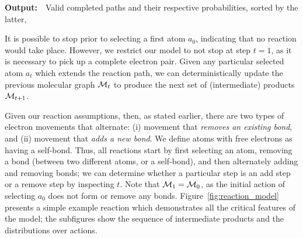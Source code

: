 \begin{algorithm}[t]
\begin{algorithmic}[1]

		
		
	
  \end{algorithmic}
  {\bf Output:}~~Valid completed paths and their respective probabilities, sorted by the latter, 
  \label{algo:valid_path}
\end{algorithm}


It is possible to stop prior to selecting a first atom $a_0$, indicating that no reaction would take place.
However, we restrict our model to not stop at step $t\!=\!1$, as it is necessary to pick up a complete electron pair. 
Given any particular selected atom $a_t$ which extends the reaction path, we can deterministically update the previous molecular graph ${\mathcal{M}}_{t}$ to produce the next set of (intermediate) products ${\mathcal{M}}_{t+1}$.

Given our reaction assumptions, then, as stated earlier, there are two types of electron movements that alternate: 
(i) movement that \emph{removes an existing bond}, and 
(ii) movement that \emph{adds a new bond}. 
We define atoms with free electrons as having a self-bond.
Thus, all reactions start by first selecting an atom, removing a bond (between two different atoms, or a self-bond), and then alternately adding and removing bonds;
we can determine whether a particular step is an add step or a remove step by inspecting $t$.
Note that ${\mathcal{M}}_1 = {\mathcal{M}}_0$, as the initial action of selecting $a_0$ does not form or remove any bonds.
Figure~\ref{fig:reaction_model} presents a simple example reaction which demonstrates all the critical features of the model;
the subfigures show the sequence of intermediate products and the distributions over actions.



